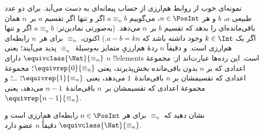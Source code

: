 \documentclass[../../../include/open-logic-section]{subfiles}
\begin{document}
\begin{ex}
نمونه‌ای خوب از روابط هم‌ارزی از حساب پیمانه‌ای به دست می‌آید. برای دو عدد طبیعی $a$، $b$ و هر $n \in \PosInt$، می‌گوییم $a \equiv_n b$ اگر و تنها اگر
تقسیم $a$ بر~$n$ همان باقی‌مانده‌ای را بدهد که تقسیم $b$ بر~$n$ می‌دهد.
(به‌صورتی نمادین‌تر: $a \equiv_n b$ اگر و تنها اگر یک $k \in
\Int$ وجود داشته باشد که $a - b = kn$.) اکنون، $\equiv_n$ برای
هر~$n$ رابطه‌ای هم‌ارزی است. و دقیقاً $n$ ردهٔ هم‌ارزیِ متمایز
به‌وسیلهٔ~$\equiv_n$ پدید می‌آیند؛ یعنی $\equivclass{\Nat}{\equiv_n}$
دارای $n$ !!{element}s است. این رده‌ها عبارت‌اند از: مجموعهٔ اعدادی که
بر $n$ بدون باقی‌مانده بخش‌پذیرند، یعنی $\equivrep{0}{\equiv_n}$؛
مجموعهٔ اعدادی که تقسیمشان بر $n$ باقی‌ماندهٔ~$1$ می‌دهد، یعنی
$\equivrep{1}{\equiv_n}$؛ \ldots؛ و مجموعهٔ اعدادی که تقسیمشان بر~$n$
باقی‌ماندهٔ~$n-1$ می‌دهد، یعنی~$\equivrep{n-1}{\equiv_n}$.
\end{ex}

\begin{prob}
نشان دهید که $\equiv_n$ برای هر $n \in
\PosInt$ رابطه‌ای هم‌ارزی است و
$\equivclass{\Nat}{\equiv_n}$ دقیقاً $n$ عضو دارد.
\end{prob}
\end{document}
